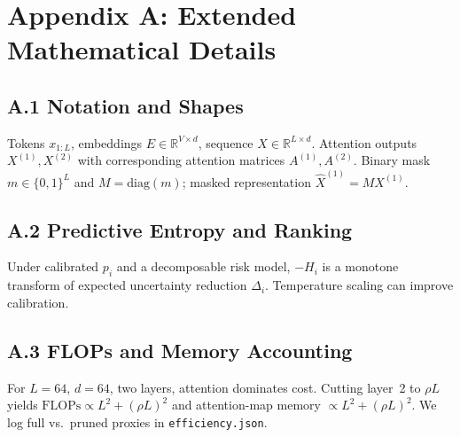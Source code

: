 \documentclass{article}
\newcommand{\Lseq}{L}
\newcommand{\dmodel}{d}
\begin{document}
\appendix

\section*{Appendix A: Extended Mathematical Details}
\subsection*{A.1 Notation and Shapes}
Tokens $x_{1:\Lseq}$, embeddings $E\in\mathbb{R}^{V\times\dmodel}$, sequence $X\in\mathbb{R}^{\Lseq\times\dmodel}$. Attention outputs $X^{(1)},X^{(2)}$ with corresponding attention matrices $A^{(1)},A^{(2)}$. Binary mask $m\in\{0,1\}^{\Lseq}$ and $M=\mathrm{diag}(m)$; masked representation $\hat{X}^{(1)}=MX^{(1)}$.

\subsection*{A.2 Predictive Entropy and Ranking}
Under calibrated $p_i$ and a decomposable risk model, $-H_i$ is a monotone transform of expected uncertainty reduction $\Delta_i$. Temperature scaling can improve calibration.

\subsection*{A.3 FLOPs and Memory Accounting}
For $L{=}64$, $d{=}64$, two layers, attention dominates cost. Cutting layer~2 to $\rho L$ yields $\mathrm{FLOPs}\propto L^2 + (\rho L)^2$ and attention-map memory $\propto L^2 + (\rho L)^2$. We log full vs.\ pruned proxies in \texttt{efficiency.json}.
\end{document}
